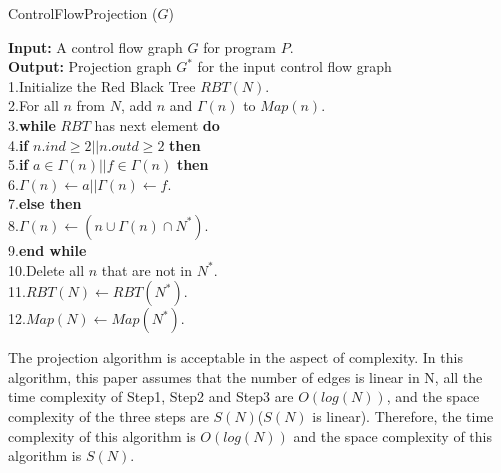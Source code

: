 \begin{algorithm}
\caption{ControlFlowProjection ($G$)}\label{alg:cfp}
\textbf{Input:} A control flow graph $G$ for program $P$.\\
\textbf{Output:} Projection graph $G^*$ for the input control flow graph\\
1.\quad	Initialize the Red Black Tree $\mathit{RBT}(N)$.\\
2.\quad	For all $n$ from $N$, add $n$ and $\Gamma(n)$ to $\mathit{Map}(n)$.\\
3.\quad	\textbf{while} $\mathit{RBT}$ has next element \textbf{do}\\
4.\quad	\quad \textbf{if} $n.ind\geq 2 || n.outd\geq 2$ \textbf{then}\\
5.\quad \quad \quad    \textbf{if} $a\in \Gamma(n) || f\in \Gamma(n)$ \textbf{then}\\
6.\quad \quad \quad \quad	   $\Gamma(n)\leftarrow a || \Gamma(n)\leftarrow f$.\\
7.\quad \quad \textbf{else then} \\
8.\quad \quad \quad  $\Gamma(n)\leftarrow (n\cup \Gamma(n)\cap N^*)$.\\
9.\quad\textbf{end while}\\
10.\quad	Delete all $n$ that are not in $N^*$.\\
11.\quad	$\mathit{RBT(N)} \leftarrow \mathit{RBT}(N^*)$.\\
12.\quad	$\mathit{Map}(N) \leftarrow \mathit{Map}(N^*)$.\\
\end{algorithm}

The projection algorithm is acceptable in the aspect of complexity. In this algorithm, this paper assumes that the number of edges is linear in N, all the time complexity of Step1, Step2 and Step3 are $O(log(N))$, and the space complexity of the three steps are $S(N)$($S(N)$ is linear). Therefore, the time complexity of this algorithm is $O(log(N))$ and the space complexity of this algorithm is $S(N)$.

